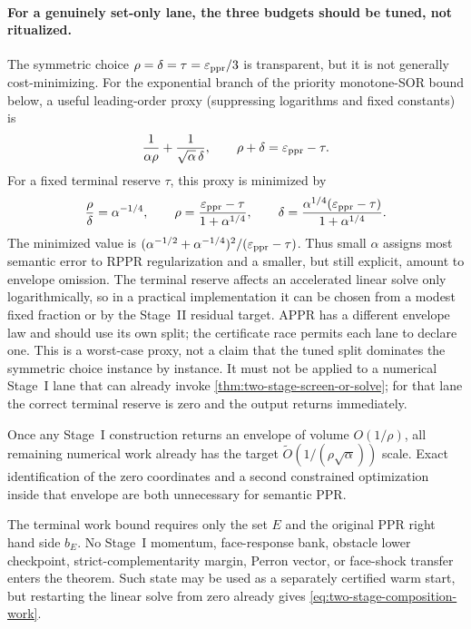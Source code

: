 \paragraph{For a genuinely set-only lane, the three budgets should be tuned,
not ritualized.}
The symmetric choice $\rho=\delta=\tau=\varepsilon_{\mathrm{ppr}}/3$ is transparent, but it is
not generally cost-minimizing.  For the exponential branch of the priority
monotone-SOR bound below, a useful leading-order proxy (suppressing logarithms
and fixed constants) is
\begin{equation}
 \frac{1}{\alpha\rho}+\frac{1}{\sqrt\alpha\,\delta},
 \qquad \rho+\delta=\varepsilon_{\mathrm{ppr}}-\tau.
 \label{eq:two-stage-budget-proxy}
\end{equation}
For a fixed terminal reserve $\tau$, this proxy is minimized by
\begin{equation}
 \frac{\rho}{\delta}=\alpha^{-1/4},\qquad
 \rho=\frac{\varepsilon_{\mathrm{ppr}}-\tau}{1+\alpha^{1/4}},\qquad
 \delta=\frac{\alpha^{1/4}(\varepsilon_{\mathrm{ppr}}-\tau)}{1+\alpha^{1/4}}.
 \label{eq:two-stage-tuned-budget}
\end{equation}
The minimized value is
$(\alpha^{-1/2}+\alpha^{-1/4})^2/(\varepsilon_{\mathrm{ppr}}-\tau)$.
Thus small $\alpha$ assigns most semantic error to RPPR regularization and a
smaller, but still explicit, amount to envelope omission.  The terminal
reserve affects an accelerated linear solve only logarithmically, so in a
 practical implementation it can be chosen from a modest fixed fraction or by
 the Stage~II residual target.  APPR has a different envelope law and should
 use its own split; the certificate race permits each lane to declare one.
 This is a worst-case proxy, not a claim that the tuned split dominates the
 symmetric choice instance by instance.  It must not be applied to a
 numerical Stage~I lane that can already invoke
 \cref{thm:two-stage-screen-or-solve}; for that lane the correct terminal
 reserve is zero and the output returns immediately.

\begin{corollary}
\label{cor:two-stage-support-not-needed}
Once any Stage~I construction returns an envelope of volume $O(1/\rho)$, all
remaining numerical work already has the target
$\widetilde O(1/(\rho\sqrt\alpha))$ scale.  Exact identification of the zero
coordinates and a second constrained optimization inside that envelope are
both unnecessary for semantic PPR.
\end{corollary}

\begin{corollary}
\label{cor:two-stage-history-disposable}
The terminal work bound requires only the set $E$ and the original PPR right
hand side $b_E$.  No Stage~I momentum, face-response bank, obstacle lower
checkpoint, strict-complementarity margin, Perron vector, or face-shock
transfer enters the theorem.  Such state may be used as a separately
certified warm start, but restarting the linear solve from zero already gives
\cref{eq:two-stage-composition-work}.
\end{corollary}

